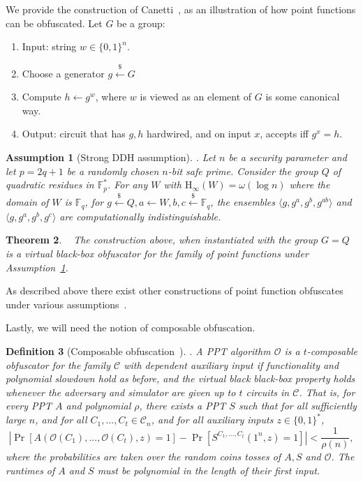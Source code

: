 \documentclass[11pt]{article}
\newcommand{\assref}[1]{\mbox{Assumption~\ref{#1}}}
\newcommand{\zo}{\ensuremath{\{0, 1\}}}
\newcommand{\Hoo}{\mathrm{H}_\infty}
\newtheorem{theorem}{Theorem}[section]
\newtheorem{definition}[theorem]{Definition}
\newtheorem{assumption}[theorem]{Assumption}
\begin{document}
We provide the construction of Canetti~\cite{canetti1997towards}, as an illustration of how point functions can be obfuscated.  Let $G$ be a group:
\begin{enumerate}  
\item Input: string $w\in \zo^n$.
\item Choose a generator $g\overset{\$}\leftarrow G$
\item Compute $h\leftarrow g^w$, where $w$ is viewed as an element of $G$ is some canonical way.
\item Output: circuit that has $g, h$ hardwired, and on input $x$, accepts iff $g^x=h$.
\end{enumerate}
\begin{assumption}[Strong DDH assumption]\label{ass:strong ddh}.  Let $n$ be a security parameter and let $p = 2q+1$ be a randomly chosen $n$-bit safe prime.  Consider the group $Q$ of quadratic residues in $\mathbb{F}_p^*$.  For any $W$ with $\Hoo(W)= \omega(\log n)$ where the domain of $W$ is $\mathbb{F}_q$, for $g\overset{\$}\leftarrow Q, a\leftarrow W, b,c \overset{\$}\leftarrow \mathbb{F}_q$, the ensembles $\langle g, g^a, g^b, g^{ab}\rangle$ and $\langle g, g^a, g^b, g^c\rangle$ are computationally indistinguishable.
\end{assumption}
\begin{theorem}~\cite{canetti1997towards}
The construction above, when instantiated with the group $G = Q$ is a virtual black-box obfuscator for the family of point functions under \assref{ass:strong ddh}.
\end{theorem}

As described above there exist other constructions of point function obfuscates under various assumptions~\cite{lynn2004positive, wee2005obfuscating}.

Lastly, we will need the notion of composable obfuscation.

\begin{definition}[Composable obfuscation~\cite{bitansky2010strong, canetti2008obfuscating,lynn2004positive}].  A PPT algorithm $\mathcal{O}$ is a $t$-\emph{composable obfuscator} for the family $\mathcal{C}$ with dependent auxiliary input if functionality and polynomial slowdown hold as before, and the virtual black black-box property holds whenever the adversary and simulator are given up to $t$ circuits in $\mathcal{C}$.  That is, for every PPT $A$ and polynomial $\rho$, there exists a PPT $S$ such that for all sufficiently large $n$, and for all $C_1,..., C_t\in \mathcal{C}_n$, and for all auxiliary inputs $z\in \zo^*$, 
\[
|\Pr[A(\mathcal{O}(C_1), ..., \mathcal{O}(C_t), z) = 1] - \Pr[S^{C_1,..., C_t}(1^n, z) = 1]| < \frac{1}{\rho(n)},
\]
where the probabilities are taken over the random coins tosses of $A, S$ and $\mathcal{O}$.  The runtimes of $A$ and $S$ must be polynomial in the length of their first input.
\end{definition}
\end{document}

